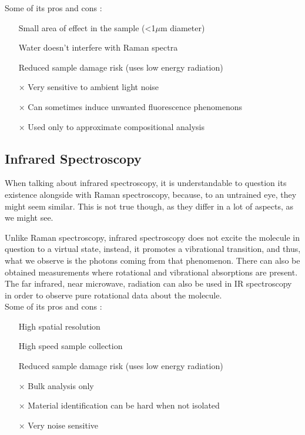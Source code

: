 \documentclass[]{report}
\begin{document}
Some of its pros and cons \cite{RM_Wiki}:
\begin{itemize}
\item[\checkmark] Small area of effect in the sample (<1$\mu$m diameter)
\item[\checkmark] Water doesn't interfere with Raman spectra
\item[\checkmark] Reduced sample damage risk (uses low energy radiation)
\item[$\times$] Very sensitive to ambient light noise
\item[$\times$] Can sometimes induce unwanted fluorescence phenomenons
\item[$\times$] Used only to approximate compositional analysis
\end{itemize}

\subsection{Infrared Spectroscopy} \label{IRS}
When talking about infrared spectroscopy, it is understandable to question its existence alongside with Raman spectroscopy, because, to an untrained eye, they might seem similar. This is not true though, as they differ in a lot of aspects, as we might see.
\par Unlike Raman spectroscopy, infrared spectroscopy does not excite the molecule in question to a virtual state, instead, it promotes a vibrational transition, and thus, what we observe is the photons coming from that phenomenon. There can also be obtained measurements where rotational and vibrational absorptions are present. The far infrared, near microwave, radiation can also be used in IR spectroscopy in order to observe pure rotational data about the molecule.\\

Some of its pros and cons \cite{IR_Art}:
\begin{itemize}
\item[\checkmark] High spatial resolution
\item[\checkmark] High speed sample collection
\item[\checkmark] Reduced sample damage risk (uses low energy radiation)
\item[$\times$] Bulk analysis only
\item[$\times$] Material identification can be hard when not isolated
\item[$\times$] Very noise sensitive
\end{itemize}
\end{document}
